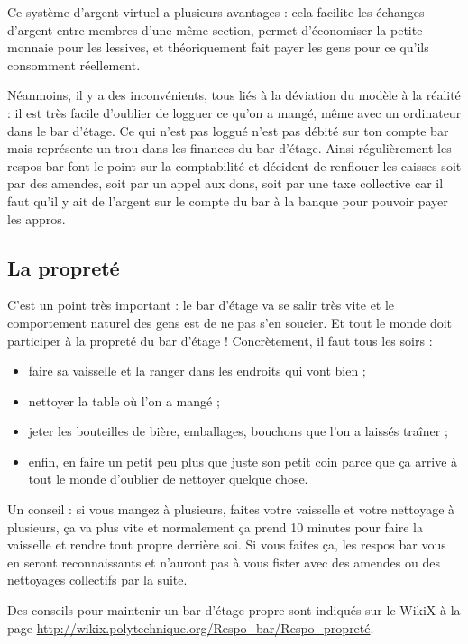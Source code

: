 \documentclass[12pt,french]{article}
\begin{document}
Ce système d'argent virtuel a plusieurs avantages : cela facilite les échanges d'argent entre membres d'une même section, permet d'économiser la petite monnaie pour les lessives, et théoriquement fait payer les gens pour ce qu'ils consomment réellement. 

Néanmoins, il y a des inconvénients, tous liés à la déviation du modèle à la réalité : il est très facile d'oublier de logguer ce qu'on a mangé, même avec un ordinateur dans le bar d'étage. Ce qui n'est pas loggué n'est pas débité sur ton compte bar mais représente un trou dans les finances du bar d'étage. Ainsi régulièrement les respos bar font le point sur la comptabilité et décident de renflouer les caisses soit par des amendes, soit par un appel aux dons, soit par une taxe collective car il faut qu'il y ait de l'argent sur le compte du bar à la banque pour pouvoir payer les appros.

\subsection{La propreté}

C'est un point très important : le bar d'étage va se salir très vite et le comportement naturel des gens est de ne pas s'en soucier. Et tout le monde doit participer à la propreté du bar d'étage ! Concrètement, il faut tous les soirs :
\begin{itemize}
	\item faire sa vaisselle et la ranger dans les endroits qui vont bien ;
	\item nettoyer la table où l'on a mangé ;
	\item jeter les bouteilles de bière, emballages, bouchons que l'on a laissés traîner ;
	\item enfin, en faire un petit peu plus que juste son petit coin parce que ça arrive à tout le monde d'oublier de nettoyer quelque chose.
\end{itemize}
Un conseil : si vous mangez à plusieurs, faites votre vaisselle et votre nettoyage à plusieurs, ça va plus vite et normalement ça prend 10 minutes pour faire la vaisselle et rendre tout propre derrière soi. Si vous faites ça, les respos bar vous en seront reconnaissants et n'auront pas à vous fister avec des amendes ou des nettoyages collectifs par la suite.

Des conseils pour maintenir un bar d'étage propre sont indiqués sur le WikiX à la page \url{http://wikix.polytechnique.org/Respo_bar/Respo_propreté}.

\clearpage
\end{document}
